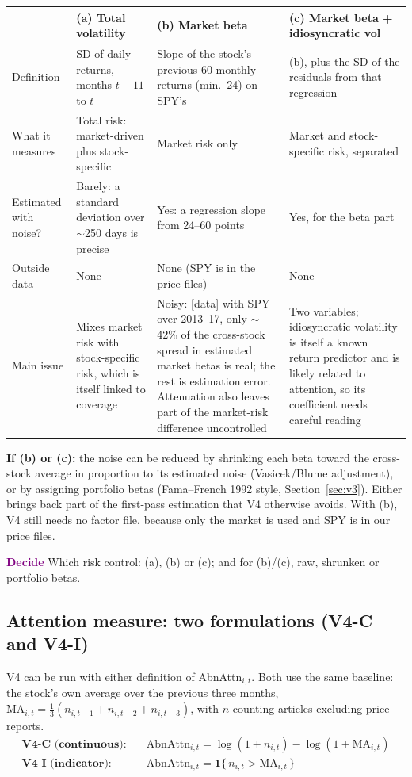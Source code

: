 \documentclass[11pt]{article}
\newcommand{\decide}{\textcolor{Purple}{\textbf{Decide}}}
\newcommand{\data}{\textcolor{NavyBlue}{\textsf{[data]}}}
\begin{document}
\begin{center}\small
\begin{tabularx}{\textwidth}{>{\raggedright}p{2.6cm} >{\raggedright}X >{\raggedright}X >{\raggedright\arraybackslash}X}
\toprule
 & \textbf{(a) Total volatility} & \textbf{(b) Market beta} & \textbf{(c) Market beta + idiosyncratic vol}\\
\midrule
Definition & SD of daily returns, months $t{-}11$ to $t$ & Slope of the stock's previous 60 monthly returns (min.\ 24) on SPY's & (b), plus the SD of the residuals from that regression\\
What it measures & Total risk: market-driven plus stock-specific & Market risk only & Market and stock-specific risk, separated\\
Estimated with noise? & Barely: a standard deviation over $\sim$250 days is precise & Yes: a regression slope from 24--60 points & Yes, for the beta part\\
Outside data & None & None (SPY is in the price files) & None\\
Main issue & Mixes market risk with stock-specific risk, which is itself linked to coverage & Noisy: \data{} with SPY over 2013--17, only $\sim$42\% of the cross-stock spread in estimated market betas is real; the rest is estimation error. Attenuation also leaves part of the market-risk difference uncontrolled & Two variables; idiosyncratic volatility is itself a known return predictor and is likely related to attention, so its coefficient needs careful reading\\
\bottomrule
\end{tabularx}
\end{center}

\textbf{If (b) or (c):} the noise can be reduced by shrinking each beta toward the cross-stock average in proportion to its estimated noise (Vasicek/Blume adjustment), or by assigning portfolio betas (Fama--French 1992 style, Section~\ref{sec:v3}). Either brings back part of the first-pass estimation that V4 otherwise avoids. With (b), V4 still needs no factor file, because only the market is used and SPY is in our price files.

\decide{} Which risk control: (a), (b) or (c); and for (b)/(c), raw, shrunken or portfolio betas.

\subsection*{Attention measure: two formulations (V4-C and V4-I)}
V4 can be run with either definition of AbnAttn$_{i,t}$. Both use the same baseline: the stock's own average over the previous three months, $\text{MA}_{i,t} = \tfrac13(n_{i,t-1}+n_{i,t-2}+n_{i,t-3})$, with $n$ counting articles excluding price reports.
\begin{align*}
\textbf{V4-C (continuous):}\quad & \text{AbnAttn}_{i,t} = \log(1+n_{i,t}) - \log(1+\text{MA}_{i,t})\\
\textbf{V4-I (indicator):}\quad & \text{AbnAttn}_{i,t} = \mathbf{1}\{\,n_{i,t} > \text{MA}_{i,t}\,\}
\end{align*}
\end{document}
